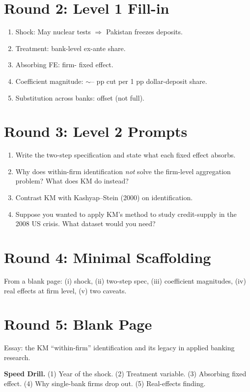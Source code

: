 \documentclass[11pt]{article}
\newcommand{\blank}[1]{\underline{\hspace{#1}}}
\begin{document}
\section*{Round 2: Level 1 Fill-in}
\begin{enumerate}
\item Shock: May \blank{1cm} nuclear tests $\Rightarrow$ Pakistan freezes \blank{2cm} deposits.
\item Treatment: bank-level ex-ante \blank{2cm} share.
\item Absorbing FE: firm-\blank{1cm} fixed effect.
\item Coefficient magnitude: $\sim$\blank{1cm}--\blank{1cm} pp cut per 1 pp dollar-deposit share.
\item Substitution across banks: \blank{1cm} offset (not full).
\end{enumerate}

\section*{Round 3: Level 2 Prompts}
\begin{enumerate}
\item Write the two-step specification and state what each fixed effect absorbs.
\item Why does within-firm identification \emph{not} solve the firm-level aggregation problem? What does KM do instead?
\item Contrast KM with Kashyap--Stein (2000) on identification.
\item Suppose you wanted to apply KM's method to study credit-supply in the 2008 US crisis. What dataset would you need?
\end{enumerate}

\section*{Round 4: Minimal Scaffolding}
From a blank page: (i) shock, (ii) two-step spec, (iii) coefficient magnitudes, (iv) real effects at firm level, (v) two caveats.

\section*{Round 5: Blank Page}
Essay: the KM ``within-firm'' identification and its legacy in applied banking research.

\vspace{6pt}
\begin{drillbox}
\textbf{Speed Drill.} (1) Year of the shock. (2) Treatment variable. (3) Absorbing fixed effect. (4) Why single-bank firms drop out. (5) Real-effects finding.
\end{drillbox}
\end{document}
